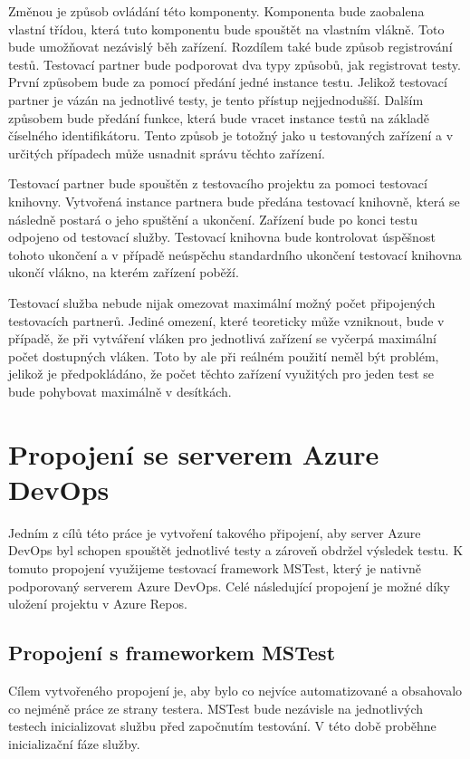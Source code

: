 Změnou je způsob ovládání této komponenty. Komponenta bude zaobalena vlastní třídou, která tuto komponentu bude spouštět na vlastním vlákně. Toto bude umožňovat nezávislý běh zařízení. Rozdílem také bude způsob registrování testů. Testovací partner bude podporovat dva typy způsobů, jak registrovat testy. První způsobem bude za pomocí předání jedné instance testu. Jelikož testovací partner je vázán na jednotlivé testy, je tento přístup nejjednodušší. Dalším způsobem bude předání funkce, která bude vracet instance testů na základě číselného identifikátoru. Tento způsob je totožný jako u testovaných zařízení a v určitých případech může usnadnit správu těchto zařízení. 

Testovací partner bude spouštěn z testovacího projektu za pomoci testovací knihovny. Vytvořená instance partnera bude předána testovací knihovně, která se následně postará o jeho spuštění a ukončení. Zařízení bude po konci testu odpojeno od testovací služby. Testovací knihovna bude kontrolovat úspěšnost tohoto ukončení a v případě neúspěchu standardního ukončení testovací knihovna ukončí vlákno, na kterém zařízení poběží.

Testovací služba nebude nijak omezovat maximální možný počet připojených testovacích partnerů. Jediné omezení, které teoreticky může vzniknout, bude v případě, že při vytváření vláken pro jednotlivá zařízení se vyčerpá maximální počet dostupných vláken. Toto by ale při reálném použití neměl být problém, jelikož je předpokládáno, že počet těchto zařízení využitých pro jeden test se bude pohybovat maximálně v desítkách. 

\clearpage

\section{Propojení se serverem Azure DevOps}

Jedním z cílů této práce je vytvoření takového připojení, aby server Azure DevOps byl schopen spouštět jednotlivé testy a zároveň obdržel výsledek testu. K tomuto propojení využijeme testovací framework MSTest, který je nativně podporovaný serverem Azure DevOps. Celé následující propojení je možné díky uložení projektu v Azure Repos.

\subsection{Propojení s frameworkem MSTest}
Cílem vytvořeného propojení je, aby bylo co nejvíce automatizované a obsahovalo co nejméně práce ze strany testera. MSTest bude nezávisle na jednotlivých testech inicializovat službu před započnutím testování. V této době proběhne inicializační fáze služby. 

